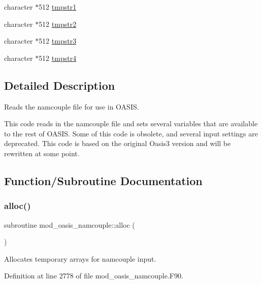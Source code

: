 \begin{DoxyCompactItemize}
\item 
character $\ast$512 \hyperlink{namespacemod__oasis__namcouple_aca533555969c4dff9419daac8c70bbda}{tmpstr1}
\item 
character $\ast$512 \hyperlink{namespacemod__oasis__namcouple_a675d6fc398ff3a060fbd9949fde4d0e2}{tmpstr2}
\item 
character $\ast$512 \hyperlink{namespacemod__oasis__namcouple_a5564b823ced851e25d198f2c300dc138}{tmpstr3}
\item 
character $\ast$512 \hyperlink{namespacemod__oasis__namcouple_ada1acbaf7e666b7220e3b7fb8d0f2549}{tmpstr4}
\end{DoxyCompactItemize}


\subsection{Detailed Description}
Reads the namcouple file for use in O\+A\+S\+IS. 

This code reads in the namcouple file and sets several variables that are available to the rest of O\+A\+S\+IS. Some of this code is obsolete, and several input settings are deprecated. This code is based on the original Oasis3 version and will be rewritten at some point. 

\subsection{Function/\+Subroutine Documentation}
\mbox{\label{namespacemod__oasis__namcouple_a0d85a5dcb3fab17a680cceed332b9668}} 
\subsubsection{\texorpdfstring{alloc()}{alloc()}}
{\footnotesize\ttfamily subroutine mod\+\_\+oasis\+\_\+namcouple\+::alloc (\begin{DoxyParamCaption}{ }\end{DoxyParamCaption})\hspace{0.3cm}{\ttfamily [private]}}



Allocates temporary arrays for namcouple input. 



Definition at line 2778 of file mod\+\_\+oasis\+\_\+namcouple.\+F90.

